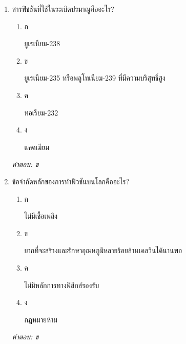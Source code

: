 \documentclass[12pt]{article}
\begin{document}
\begin{enumerate}[label=\arabic*., itemsep=0.5\baselineskip, topsep=0.5\baselineskip, leftmargin=*]
\item สารฟิชชันที่ใช้ในระเบิดปรมาณูคืออะไร?
\begin{enumerate}[label=\alph*)., itemsep=0.3\baselineskip, topsep=0.3\baselineskip]
\item ก\ 
\begin{minipage}[t]{0.9\linewidth}
\raggedright ยูเรเนียม-238
\end{minipage}
\item ข\ 
\begin{minipage}[t]{0.9\linewidth}
\raggedright ยูเรเนียม-235 หรือพลูโทเนียม-239 ที่มีความบริสุทธิ์สูง
\end{minipage}
\item ค\ 
\begin{minipage}[t]{0.9\linewidth}
\raggedright ทอเรียม-232
\end{minipage}
\item ง\ 
\begin{minipage}[t]{0.9\linewidth}
\raggedright แคดเมียม
\end{minipage}
\end{enumerate}
\vspace{-0.3\baselineskip}
\begin{small}
\textit{คำตอบ: ข}
\end{small}

\item ข้อจำกัดหลักของการทำฟิวชันบนโลกคืออะไร?
\begin{enumerate}[label=\alph*)., itemsep=0.3\baselineskip, topsep=0.3\baselineskip]
\item ก\ 
\begin{minipage}[t]{0.9\linewidth}
\raggedright ไม่มีเชื้อเพลิง
\end{minipage}
\item ข\ 
\begin{minipage}[t]{0.9\linewidth}
\raggedright ยากที่จะสร้างและรักษาอุณหภูมิหลายร้อยล้านเคลวินได้นานพอ
\end{minipage}
\item ค\ 
\begin{minipage}[t]{0.9\linewidth}
\raggedright ไม่มีหลักการทางฟิสิกส์รองรับ
\end{minipage}
\item ง\ 
\begin{minipage}[t]{0.9\linewidth}
\raggedright กฎหมายห้าม
\end{minipage}
\end{enumerate}
\vspace{-0.3\baselineskip}
\begin{small}
\textit{คำตอบ: ข}
\end{small}


\end{enumerate}
\end{document}
